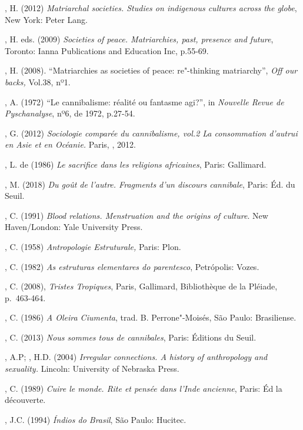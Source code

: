 , H. (2012) \emph{Matriarchal societies. Studies on
indigenous cultures across the globe}, New York: Peter Lang.

, H. eds. (2009) \emph{Societies of peace.
Matriarchies, past, presence and future}, Toronto: Ianna Publications
and Education Inc, p.55-69.

, H. (2008). ``Matriarchies as societies of peace:
re"-thinking matriarchy'', \emph{Off our backs,} Vol.38, nº1.

, A. (1972) ``Le cannibalisme: réalité ou fantasme agi?'', in
\emph{Nouvelle Revue de Pyschanalyse}, nº6, de 1972, p.27-54.

, G. (2012) \emph{Sociologie comparée du cannibalisme,
vol.2 La consommation d'autrui en Asie et en Océanie.} Paris, , 2012.

, L. de (1986) \emph{Le sacrifice dans les religions africaines},
Paris: Gallimard.

, M. (2018) \emph{Du goût de l'autre. Fragments d'un discours
cannibale}, Paris: Éd. du Seuil.

, C. (1991) \emph{Blood relations. Menstruation and the origins of
culture}. New Haven/London: Yale University Press.

, C. (1958) \emph{Antropologie Estruturale,} Paris: Plon.

, C. (1982) \emph{As estruturas elementares do parentesco},
Petrópolis: Vozes.

, C. (2008), \emph{Tristes Tropiques}, Paris, Gallimard,
Bibliothèque de la Pléiade, p.~463-464.

, C. (1986) \emph{A Oleira Ciumenta}, trad. B.
Perrone"-Moisés, São Paulo: Brasiliense.

, C. (2013) \emph{Nous sommes tous de cannibales}, Paris:
Éditions du Seuil.

, A.P; , H.D. (2004) \emph{Irregular connections. A history of
anthropology and sexuality.} Lincoln: University of Nebraska Press.

, C. (1989) \emph{Cuire le monde. Rite et pensée dans l'Inde
ancienne}, Paris: Éd la découverte.

, J.C. (1994) \emph{Índios do Brasil}, São Paulo: Hucitec.

